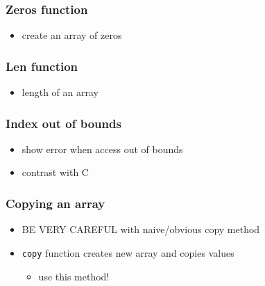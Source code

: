 \documentclass[14pt]{beamer}
\newcommand\red[1]{{\color{red} #1}}
\begin{document}

\begin{frame}[fragile]

\frametitle{Zeros function}

\begin{itemize}
	\item create an array of zeros
\end{itemize}

\end{frame}


\begin{frame}[fragile]

\frametitle{Len function}

\begin{itemize}
	\item length of an array
\end{itemize}

\end{frame}


\begin{frame}[fragile]

\frametitle{Index out of bounds}

\begin{itemize}
	\item show error when access out of bounds
	\item contrast with C
\end{itemize}

\end{frame}


\begin{frame}[fragile]

\frametitle{Copying an array}

\begin{itemize}
	\item \red{BE VERY CAREFUL} with naive/obvious copy method
	\item \texttt{copy} function creates new array and copies values
	\begin{itemize}
		\item use this method!
	\end{itemize}
\end{itemize}

\end{frame}
\end{document}
